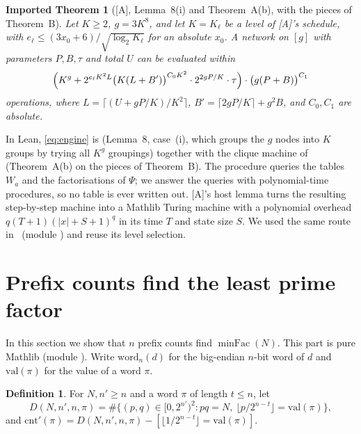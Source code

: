 \documentclass[10pt]{amsart}
\theoremstyle{plain}
\newtheorem{importedtheorem}[theorem]{Imported Theorem}
\theoremstyle{definition}
\newtheorem{definition}[theorem]{Definition}
\theoremstyle{remark}
\numberwithin{equation}{section}
\newcommand{\minFac}{\operatorname{minFac}}
\newcommand{\A}{\textup{[A]}}
\begin{document}
\begin{importedtheorem}[\A, Lemma~8(i) and Theorem~A(b), with the pieces of Theorem~B]\label{imp:engine}
Let $K\ge2$, $g=3K^8$, and let $K=K_\ell$ be a level of \A's schedule, with
$e_\ell\le(3x_0+6)/\sqrt{\log_2K_\ell}$ for an absolute $x_0$. A network on $[g]$ with parameters
$P,B,\tau$ and total $U$ can be evaluated within
\begin{equation}\label{eq:engine}
  \Bigl(K^g+2^{e_\ell K^2 L}\bigl(K(L+B')\bigr)^{C_0K^2}\cdot2^{2gP/K}\cdot\tau\Bigr)\cdot\bigl(g(P+B)\bigr)^{C_1}
\end{equation}
operations, where $L=\lceil(U+gP/K)/K^2\rceil$, $B'=\lceil2gP/K\rceil+g^2B$, and $C_0,C_1$ are absolute.
\end{importedtheorem}

\noindent In Lean, \eqref{eq:engine} is  (Lemma~8, case~(i),
which groups the $g$ nodes into $K$ groups by trying all $K^g$ groupings) together with the clique
machine of  (Theorem~A(b) on the pieces of Theorem~B).
The procedure queries the tables $W_a$ and the factorisations of $\Psi$; we answer the queries with
polynomial-time procedures, so no table is ever written out. \A's host lemma
 turns the resulting step-by-step machine into a Mathlib Turing machine
with a polynomial overhead $q(T+1)(|x|+S+1)^q$ in its time $T$ and state size $S$. We used the
same route in~\cite{Tulsyan26} (module ) and reuse its level selection.

\section{Prefix counts find the least prime factor}\label{sec:search}

In this section we show that $n$ prefix counts find $\minFac(N)$. This part is pure Mathlib (module ). Write $\mathrm{word}_n(d)$ for the big-endian
$n$-bit word of $d$ and $\mathrm{val}(\pi)$ for the value of a word $\pi$.

\begin{definition}\label{def:D}
For $N,n'\ge n$ and a word $\pi$ of length $t\le n$, let
\[
  D(N,n',n,\pi)=\#\bigl\{(p,q)\in[0,2^{n'})^2: pq=N,\ \lfloor p/2^{n-t}\rfloor=\mathrm{val}(\pi)\bigr\},
\]
and $\mathrm{cnt}'(\pi)=D(N,n',n,\pi)-[\lfloor1/2^{n-t}\rfloor=\mathrm{val}(\pi)]$.
\end{definition}
\end{document}
